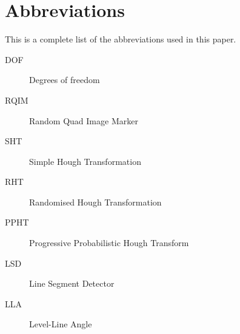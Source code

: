 \chapter*{Abbreviations}
This is a complete list of the abbreviations used in this paper.

\begin{description}
	\item[DOF] Degrees of freedom
	\item[RQIM] Random Quad Image Marker
	\item[SHT] Simple Hough Transformation
	\item[RHT] Randomised Hough Transformation
	\item[PPHT] Progressive Probabilistic Hough Transform
	\item[LSD] Line Segment Detector
	\item[LLA] Level-Line Angle
\end{description}